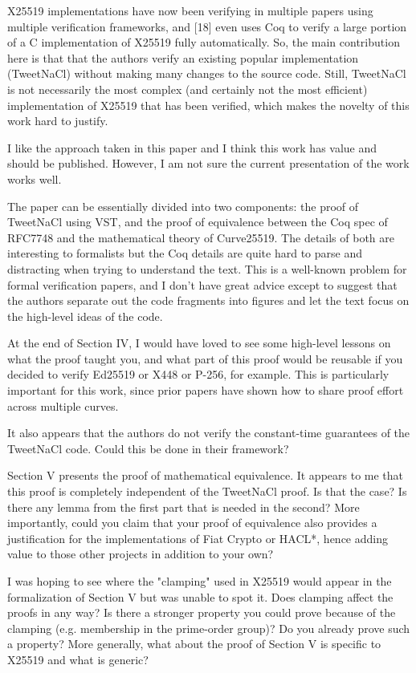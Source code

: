 \begin{center}
\end{center}

X25519 implementations have now been verifying in multiple papers using multiple
verification frameworks, and [18] even uses Coq to verify a large portion of a C
implementation of X25519 fully automatically. So, the main contribution here is
that that the authors verify an existing popular implementation (TweetNaCl)
without making many changes to the source code. Still, TweetNaCl is not necessarily
the most complex (and certainly not the most efficient) implementation of X25519
that has been verified, which makes the novelty of this work hard to justify.


\begin{center}
\end{center}

I like the approach taken in this paper and I think this work has value and
should be published.
However, I am not sure the current presentation of the work works well.

The paper can be essentially divided into two components: the proof of TweetNaCl
using VST, and the proof of equivalence between the Coq spec of RFC7748 and the
mathematical theory of Curve25519.  The details of both are interesting to
formalists but the Coq details are quite hard to parse and distracting when
trying to understand the text. This is a well-known problem for formal
verification papers, and I don't have great advice except to suggest that the
authors separate out the code fragments into figures and let the text focus
on the high-level ideas of the code.

At the end of Section IV, I would have loved to see some high-level lessons on
what the proof taught you, and what part of this proof would be reusable if you
decided to verify Ed25519 or X448 or P-256, for example. This is particularly
important for this work, since prior papers have shown how to share proof effort
across multiple curves.

It also appears that the authors do not verify the constant-time guarantees of
the TweetNaCl code. Could this be done in their framework?

Section V presents the proof of mathematical equivalence. It appears to me that
this proof is completely independent of the TweetNaCl proof. Is that the case?
Is there any lemma from the first part that is needed in the second? More
importantly, could you claim that your proof of equivalence also provides a
justification for the implementations of Fiat Crypto or HACL*, hence adding
value to those other projects in addition to your own?

I was hoping to see where the "clamping" used in X25519 would appear in the
formalization of Section V but was unable to spot it. Does clamping affect the
proofs in any way? Is there a stronger property you could prove because of the
clamping (e.g. membership in the prime-order group)?
Do you already prove such a property?  More generally, what about the proof of
Section V is specific to X25519 and what is generic?

